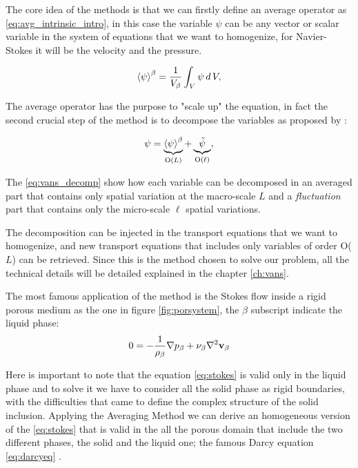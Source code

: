 The core idea of the methods is that we can firstly define an average operator as \eqref{eq:avg_intrinsic_intro}, in this case the variable $\psi$ can be any vector or scalar variable in the system of equations that we want to homogenize, for Navier-Stokes it will be the velocity and the pressure.

\begin{equation}
{\left< \psi \right>}^{\beta} = \dfrac{1}{V_\beta} \int_{V} \psi \, d \, V,
\label{eq:avg_intrinsic_intro}
\end{equation}

The average operator has the purpose to "scale up" the equation, in fact the second crucial step of the method is to decompose the variables as proposed by \citet{gray1975derivation}:

\begin{equation}
\psi =   \underbrace{ {\left< \psi \right>}^{\beta} }_\text{O($L$)}  +  \underbrace{\tilde{\psi} }_\text{O($\ell$)},
\label{eq:vans_decomp}
\end{equation}

The \eqref{eq:vans_decomp} show how each variable can be decomposed in an averaged part that contains only spatial variation at the macro-scale $L$ and a \textit{fluctuation} part that contains only the micro-scale $\ell$ spatial variations.

The decomposition can be injected in the transport equations that we want to homogenize, and new transport equations that includes only variables of order O($L$) can be retrieved.
Since this is the method chosen to solve our problem, all the technical details will be detailed explained in the chapter \ref{ch:vans}.

The most famous application of the method is the Stokes flow inside a rigid porous medium as the one in figure \ref{fig:porsystem}, the $\beta$ subscript indicate the liquid phase:
\begin{equation}
0 = -\dfrac{1}{\rho_{\beta}} \nabla p_{\beta} +\nu_{\beta} \nabla^2 \textbf{v}_{\beta}
\label{eq:stokes}
\end{equation} 

Here is important to note that the equation \eqref{eq:stokes} is valid only in the liquid phase and to solve it we have to consider all the solid phase as rigid boundaries, with the difficulties that came to define the complex structure of the solid inclusion.
Applying the Averaging Method we can derive an homogeneous version of the \eqref{eq:stokes} that is valid in the all the porous domain that include the two different phases, the solid and the liquid one; the famous Darcy equation \eqref{eq:darcyeq} \citet{whitaker1986flow}.

